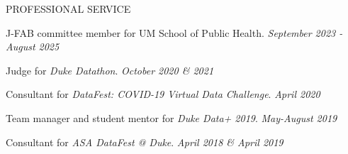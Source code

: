 \documentclass{resume} %
\begin{document}
\begin{rSection}{PROFESSIONAL SERVICE}
 
 J-FAB committee member for UM School of Public Health.  \hfill {\em September 2023 - August 2025}

Judge for \emph{Duke Datathon}.  \hfill {\em October 2020 \& 2021}



Consultant for \emph{DataFest: COVID-19 Virtual Data Challenge}.  \hfill {\em April 2020}


Team manager and student mentor for \emph{Duke Data+ 2019}. \hfill {\em May-August 2019}


Consultant for \emph{ASA DataFest @ Duke}. \hfill {\em April 2018 \& April 2019}
\end{rSection}
\end{document}
